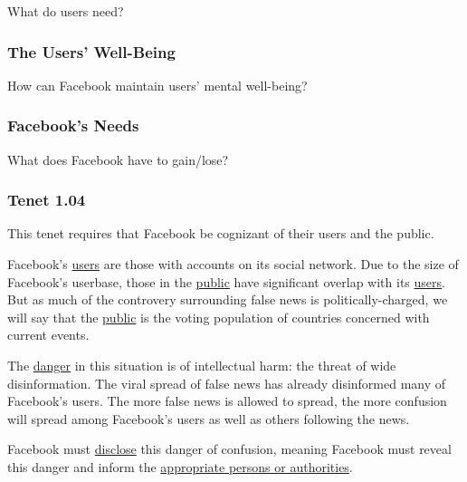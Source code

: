 \par What do users need?

\subsubsection{The Users' Well-Being}

\par How can Facebook maintain users' mental well-being? 

\subsubsection{Facebook's Needs}

\par What does Facebook have to gain/lose?

\subsubsection{Tenet 1.04}


\par This tenet requires that Facebook be cognizant of their users and the public.

\par Facebook's \ul{users} are those with accounts on its social network. Due to the size of Facebook's userbase, those in the \ul{public} have significant overlap with its \ul{users}. But as much of the controvery surrounding false news is politically-charged, we will say that the \ul{public} is the voting population of countries concerned with current events.

\par The \ul{danger} in this situation is of intellectual harm: the threat of wide disinformation. The viral spread of false news has already disinformed many of Facebook's users. The more false news is allowed to spread, the more confusion will spread among Facebook's users as well as others following the news. 

\par Facebook must \ul{disclose} this danger of confusion, meaning Facebook must reveal this danger and inform the \ul{appropriate persons or authorities}.

